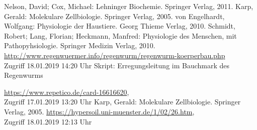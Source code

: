 \documentclass[11pt]{article}
\begin{document}
\begin{thebibliography}{999}
 Nelson, David; Cox, Michael: Lehninger Biochemie. Springer Verlag, 2011.
 Karp, Gerald: Molekulare Zellbiologie. Springer Verlag, 2005.
 von Engelhardt, Wolfgang: Physiologie der Haustiere. Georg Thieme Verlag, 2010. 
 Schmidt, Robert; Lang, Florian; Heckmann, Manfred: Physiologie des Menschen, mit Pathopyhsiologie. Springer Medizin Verlag, 2010. 
 \url{http://www.regenwuermer.info/regenwurm/regenwurm-koerperbau.php} \\Zugriff 18.01.2019 14:20 Uhr
 Skript: Erregungsleitung im Bauchmark des Regenwurms

 \url{https://www.repetico.de/card-16616620}, \\Zugriff 17.01.2019 13:20 Uhr
 Karp, Gerald: Molekulare Zellbiologie. Springer Verlag, 2005.
 \url{https://hypersoil.uni-muenster.de/1/02/26.htm}, \\Zugriff 18.01.2019 12:13 Uhr
\end{thebibliography}
\end{document}
